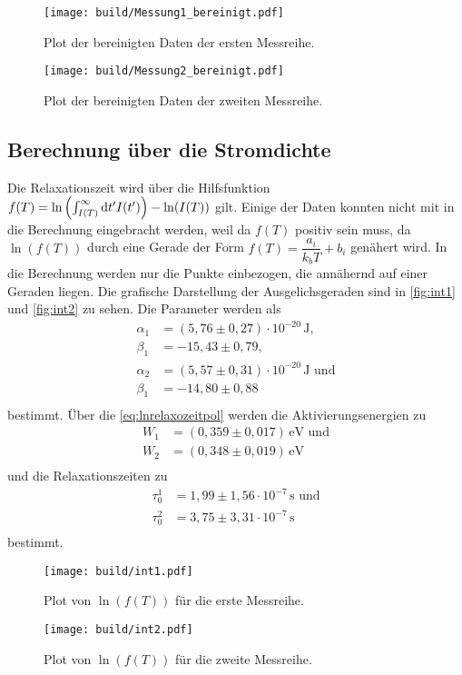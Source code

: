 \begin{figure}[H]
    \centering
    \texttt{[image: build/Messung1\_bereinigt.pdf]}
    \caption{Plot der bereinigten Daten der ersten Messreihe.}
    \label{fig:BereinigteDaten1}
\end{figure}
\begin{figure}[H]
    \centering
    \texttt{[image: build/Messung2\_bereinigt.pdf]}
    \caption{Plot der bereinigten Daten der zweiten Messreihe.}
    \label{fig:BereinigteDaten2}
\end{figure}
\subsection{Berechnung über die Stromdichte}
\label{sec:BerechnungStromdichte}

Die Relaxationszeit wird über die Hilfsfunktion $f(T) = \ln \left(\int^\infty_{I(T)} \mathrm{d} t' I(t') \right) - \ln (I(T))$ gilt.
Einige der Daten konnten nicht mit in die Berechnung eingebracht werden, weil da $f(T)$ positiv sein muss, 
da $\ln \left(f(T)\right)$ durch eine Gerade der Form $f(T) = \dfrac{a_i}{k_b T} + b_i$ genähert wird.
In die Berechnung werden nur die Punkte einbezogen, die annähernd auf einer Geraden liegen.
Die grafische Darstellung der Ausgelichsgeraden sind in \autoref{fig:int1} und \autoref{fig:int2} zu sehen.
Die Parameter werden als 
\begin{align*}
    \alpha_1 &=   (5,76   \pm 0,27) \cdot 10^{-20} \, \unit{\joule} , \\
    \beta_1 &= -15,43   \pm 0,79                                ,\\
    \alpha_2 &=   (5,57   \pm 0,31) \cdot 10^{-20} \,\unit{\joule} \, \, \text{und}\\
    \beta_1 &= -14,80   \pm 0,88\\
\end{align*}
bestimmt.
Über die \eqref{eq:lnrelaxozeitpol} werden die Aktivierungsenergien zu 
\begin{align*}   
    W_1 &=   (0,359 \pm 0,017) \, \unit{\electronvolt} \, \, \text{und}  \\
    W_2 &=   (0,348 \pm 0,019) \, \unit{\electronvolt} \\
\end{align*}
und die Relaxationszeiten zu 
\begin{align*}
    \tau_{0}^{1} &=   1,99 \pm 1,56 \cdot 10^{-7} \, \unit{\second} \, \, \text{und} \\
    \tau_{0}^{2} &=   3,75 \pm 3,31 \cdot 10^{-7} \, \unit{\second}         \\
\end{align*}
bestimmt.
\begin{figure}[H]
    \centering
    \texttt{[image: build/int1.pdf]}
    \caption{Plot von $\ln \left(f(T)\right)$ für die erste Messreihe.}
    \label{fig:int1}
\end{figure}
\begin{figure}[H]
    \centering
    \texttt{[image: build/int2.pdf]}
    \caption{Plot von $\ln \left(f(T)\right)$ für die zweite Messreihe.}
    \label{fig:int2}
\end{figure}



